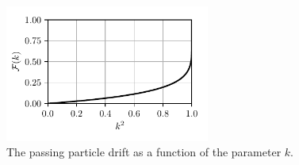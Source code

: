 \begin{figure}
    \centering
    \includegraphics[width=0.6\textwidth]{3_chapters/2_conclusion_outlook/Fk.pdf}
    \caption{The passing particle drift as a function of the parameter $k$.}
    \label{fig: F(k)}
\end{figure}

